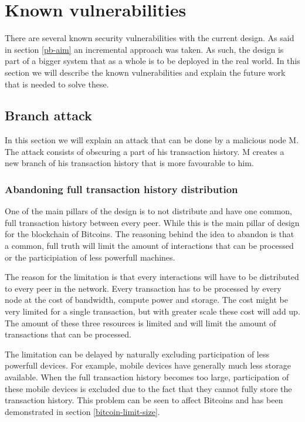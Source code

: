 \chapter{Known vulnerabilities}
\label{problems}
There are several known security vulnerabilities with the current design.
As said in section \ref{pb-aim} an incremental approach was taken.
As such, the design is part of a bigger system that as a whole is to be deployed in the real world.
In this section we will describe the known vulnerabilities
and explain the future work that is needed to solve these.

\section{Branch attack}
In this section we will explain an attack that can be done by a malicious node M.
The attack consists of obscuring a part of his transaction history.
M creates a new branch of his transaction history that is more favourable to him.

\subsection{Abandoning full transaction history distribution}
One of the main pillars of the design is to not distribute
and have one common, full transaction history between every peer.
While this is the main pillar of design for the blockchain of Bitcoins.
The reasoning behind the idea to abandon is that a common, full truth
will limit the amount of interactions that can be processed
or the participiation of less powerfull machines.

The reason for the limitation is that every interactions will have to be distributed to every peer in the network.
Every transaction has to be processed by every node at the cost of bandwidth, compute power and storage.
The cost might be very limited for a single transaction,
but with greater scale these cost will add up.
The amount of these three resources is limited and will limit the amount of transactions that can be processed.

The limitation can be delayed by naturally excluding participation of less powerfull devices.
For example, mobile devices have generally much less storage available.
When the full transaction history becomes too large,
participation of these mobile devices is excluded due to the fact that they cannot fully store the transaction history.
This problem can be seen to affect Bitcoins and has been demonstrated in section \ref{bitcoin-limit-size}.


